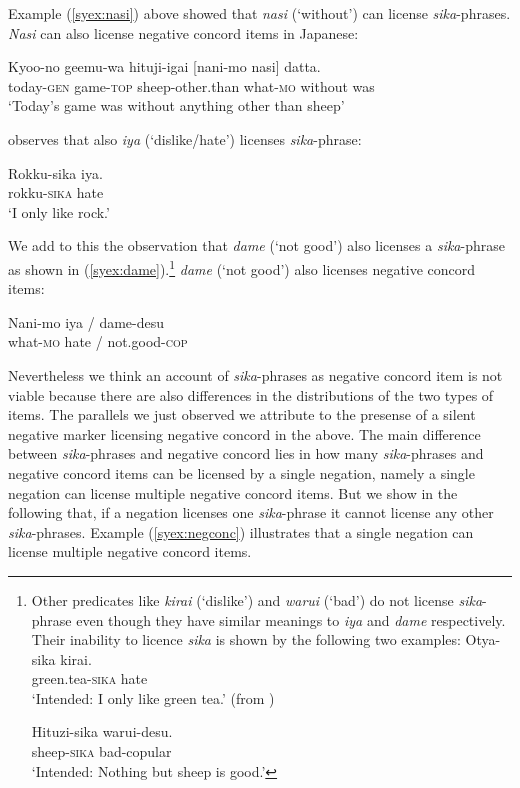 \documentclass[output=paper,colorlinks,citecolor=brown,
]{langscibook}
\def\M#1{\textsc{#1}}
\begin{document}
Example (\ref{syex:nasi}) above showed that \emph{nasi} (`without') can license \emph{sika}-phrases.  \emph{Nasi} can also license negative concord items in Japanese:

\ea \gll Kyoo-no geemu-wa hituji-igai [nani-mo nasi] datta.\\
today-\M{gen} game-\M{top} sheep-other.than what-\textsc{mo} without was\\
\glt `Today's game was without anything other than sheep'\z


\cite{hasegawa11a} observes that also \emph{iya} (`dislike/hate')  licenses \emph{sika}-phrase:

\ea \gll Rokku-sika iya.\\
rokku-\M{sika} hate \\
\glt `I only like rock.'\z

We add to this the observation that  \emph{dame} (`not good') also licenses a \emph{sika}-phrase as shown in (\ref{syex:dame}).\footnote{Other predicates like \emph{kirai} (`dislike') and \emph{warui} (`bad') do not license \emph{sika}-phrase even though they have similar meanings to \emph{iya} and \emph{dame} respectively.
Their inability to licence \emph{sika} is shown by the following two examples:
\ea \gll *Otya-sika kirai.\\
green.tea-\M{sika} hate \\
\glt `Intended: I only like green tea.' (from \citealt{hasegawa11a})\z

\ea \gll *Hituzi-sika warui-desu.\\
sheep-\M{sika} bad-copular\\
\glt `Intended: Nothing but sheep is good.'\z
}
\emph{dame} (`not good') also licenses negative concord items:

\ea \label{syex:dame}
   \gll Nani-mo iya / dame-desu\\
   what-\M{mo} hate / not.good-\M{cop}\\\z

Nevertheless we think an account of \emph{sika}-phrases as negative concord item is not viable because there are also differences in the distributions of the two types of items.  
The parallels we just observed we attribute to the presense of a silent negative marker licensing negative concord in the above.
The main difference between \emph{sika}-phrases and negative concord lies in how many \emph{sika}-phrases and  negative concord items can be licensed by a single negation, namely a single negation can license multiple negative concord items.  
But we show in the following that, if a negation licenses one \emph{sika}-phrase it cannot license any other \emph{sika}-phrases.  
Example (\ref{syex:negconc}) illustrates that a single negation can license multiple negative concord items.
\end{document}
